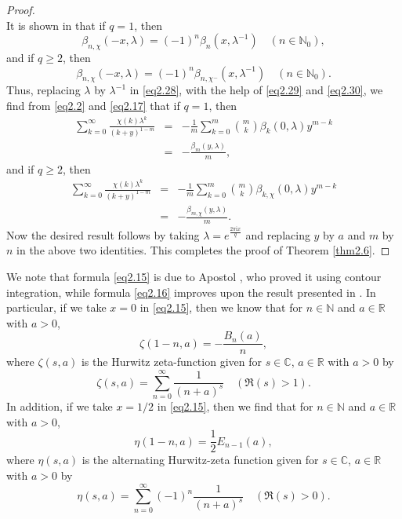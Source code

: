\documentclass[reqno]{amsart}
\numberwithin{equation}{section}
\begin{document}
\begin{proof}
\begin{equation}
\end{equation}
It is shown in \cite[Proposition 2.3]{he} that if $q=1$, then
\begin{equation}\label{eq2.29}
\beta_{n,\chi}(-x,\lambda)=(-1)^{n}\beta_{n}(x,\lambda^{-1})\quad(n\in\mathbb{N}_{0}),
\end{equation}
and if $q\geqslant2$, then
\begin{equation}\label{eq2.30}
\beta_{n,\chi}(-x,\lambda)=(-1)^{n}\beta_{n,\chi^{-}}(x,\lambda^{-1})\quad(n\in\mathbb{N}_{0}).
\end{equation}
Thus, replacing $\lambda$ by $\lambda^{-1}$ in \eqref{eq2.28}, with the help of \eqref{eq2.29} and \eqref{eq2.30}, we find from \eqref{eq2.2} and \eqref{eq2.17} that if $q=1$, then
\begin{eqnarray*}
\sum_{k=0}^{\infty}\frac{\chi(k)\lambda^{k}}{(k+y)^{1-m}}&=&-\frac{1}{m}\sum_{k=0}^{m}\binom{m}{k}\beta_{k}(0,\lambda)y^{m-k}\nonumber\\
&=&-\frac{\beta_{m}(y,\lambda)}{m},
\end{eqnarray*}
and if $q\geqslant2$, then
\begin{eqnarray*}
\sum_{k=0}^{\infty}\frac{\chi(k)\lambda^{k}}{(k+y)^{1-m}}&=&-\frac{1}{m}\sum_{k=0}^{m}\binom{m}{k}\beta_{k,\chi}(0,\lambda)y^{m-k}\nonumber\\
&=&-\frac{\beta_{m,\chi}(y,\lambda)}{m}.
\end{eqnarray*}
Now the desired result follows by taking $\lambda=e^{\frac{2\pi \mathrm{i}x}{q}}$ and replacing $y$ by $a$ and $m$ by $n$ in the above two identities. This completes the proof of Theorem \ref{thm2.6}.
\end{proof}

We note that formula \eqref{eq2.15} is due to Apostol \cite{apostol2}, who proved it using contour integration, while formula \eqref{eq2.16} improves upon the result presented in \cite[Corollary 3.7]{he}. In particular, if we take $x=0$ in \eqref{eq2.15}, then we know that for $n\in\mathbb{N}$ and $a\in\mathbb{R}$ with $a>0$,
\begin{equation}\label{eq2.31}
\zeta(1-n,a)=-\frac{B_{n}(a)}{n},
\end{equation}
where $\zeta(s,a)$ is the Hurwitz zeta-function given for $s\in\mathbb{C}$, $a\in\mathbb{R}$ with $a>0$ by
\begin{equation*}
\zeta(s,a)=\sum_{n=0}^{\infty}\frac{1}{(n+a)^{s}}\quad(\Re(s)>1).
\end{equation*}
In addition, if we take $x=1/2$ in \eqref{eq2.15}, then we find that for $n\in\mathbb{N}$ and $a\in\mathbb{R}$ with $a>0$,
\begin{equation}\label{eq2.32}
\eta(1-n,a)=\frac{1}{2}E_{n-1}(a),
\end{equation}
where $\eta(s,a)$ is the alternating Hurwitz-zeta function given for $s\in\mathbb{C}$, $a\in\mathbb{R}$ with $a>0$ by
\begin{equation*}
\eta(s,a)=\sum_{n=0}^{\infty}(-1)^{n}\frac{1}{(n+a)^{s}}\quad(\Re(s)>0).
\end{equation*}
\end{document}
